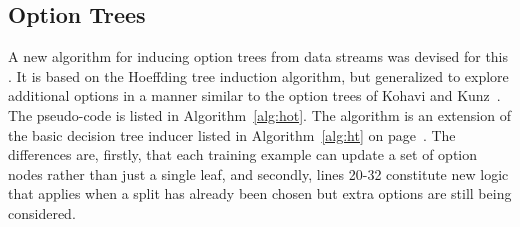 

\subsection{Option Trees} 
\label{sec:hot}

A new algorithm for inducing option trees from data streams was devised for this  \thesisc. It is based on the Hoeffding tree induction algorithm, but generalized to explore additional options in a manner similar to the option trees of Kohavi and Kunz~\cite{kohaviot}. The pseudo-code is listed in Algorithm~\ref{alg:hot}. The algorithm is an extension of the basic decision tree inducer listed in Algorithm~\ref{alg:ht} on page~\pageref{alg:ht}. The differences are, firstly, that each training example can update a set of option nodes rather than just a single leaf, and secondly, lines 20-32 constitute new logic that applies when a split has already been chosen but extra options are still being considered.

